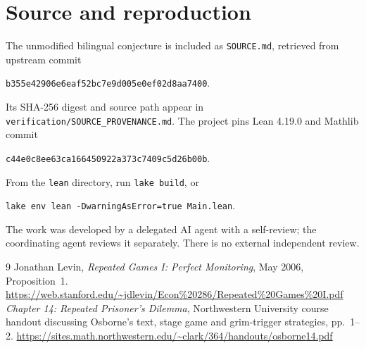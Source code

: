 \documentclass[11pt]{article}
\begin{document}
\section*{Source and reproduction}
The unmodified bilingual conjecture is included as \texttt{SOURCE.md},
retrieved from upstream commit
\begin{center}\small
\texttt{b355e42906e6eaf52bc7e9d005e0ef02d8aa7400}.
\end{center}
Its SHA-256 digest and source path appear in
\texttt{verification/SOURCE\_PROVENANCE.md}.
The project pins Lean 4.19.0 and Mathlib commit
\begin{center}\small
\texttt{c44e0c8ee63ca166450922a373c7409c5d26b00b}.
\end{center}
From the \texttt{lean} directory, run \texttt{lake build}, or
\begin{center}\small
\texttt{lake env lean -DwarningAsError=true Main.lean}.
\end{center}
The work was developed by a delegated AI agent with a self-review;
the coordinating agent reviews it separately. There is no external
independent review.

\begin{thebibliography}{9}
 Jonathan Levin, \emph{Repeated Games I: Perfect
Monitoring}, May 2006, Proposition~1.
\url{https://web.stanford.edu/~jdlevin/Econ%20286/Repeated%20Games%20I.pdf}
 \emph{Chapter 14: Repeated Prisoner's Dilemma},
Northwestern University course handout discussing Osborne's text,
stage game and grim-trigger strategies, pp.~1--2.
\url{https://sites.math.northwestern.edu/~clark/364/handouts/osborne14.pdf}
\end{thebibliography}
\end{document}
